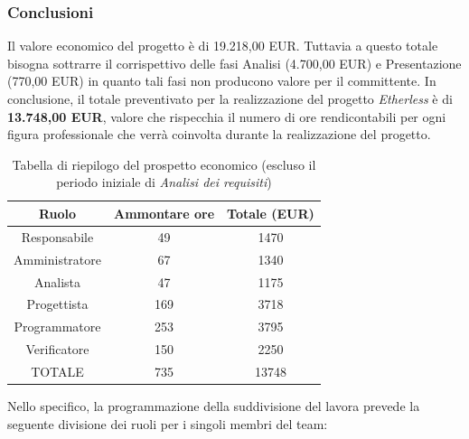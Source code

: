 \subsubsection{Conclusioni}
Il valore economico del progetto è di 19.218,00 EUR. Tuttavia a questo totale bisogna sottrarre il corrispettivo delle fasi Analisi (4.700,00 EUR) e Presentazione (770,00 EUR) in quanto tali fasi non producono valore per il committente.
\newline
\newline
In conclusione, il totale preventivato per la realizzazione del progetto \textit{Etherless} è di\\ \textbf{13.748,00 EUR}, valore che rispecchia il numero di ore rendicontabili per ogni figura professionale che verrà coinvolta durante la realizzazione del progetto. 
\begin{table}[h]
\caption{Tabella di riepilogo del prospetto economico (escluso il periodo iniziale di \textit{Analisi dei requisiti})} 
\begin{center}
\begin{tabular}{ |c|c|c|  }
 \hline
 Ruolo 		& Ammontare ore 	& Totale (EUR)\\
 \hline
 \hline
 	Responsabile	& 49 	& 1470\\
	Amministratore	& 67		& 1340\\
	Analista		& 47 	& 1175\\
	Progettista		& 169	& 3718\\
	Programmatore	& 253	& 3795\\
	Verificatore	& 150 	& 2250\\
 \hline\hline
 TOTALE		& 735		& 13748\\
  \hline
\end{tabular}
\end{center}
\end{table}
Nello specifico, la programmazione della suddivisione del lavora prevede la seguente divisione dei ruoli per i singoli membri del team:
